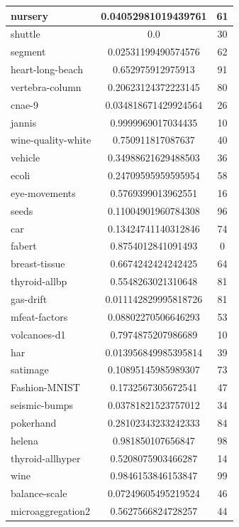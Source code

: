 \documentclass[times,specification,annotation]{itmo-student-thesis}
\begin{document}
\begin{center}
\begin{longtable}{ |m{5cm}|c|c| }
			\hline
			nursery & 0.04052981019439761 & 61 \\
			\hline
			shuttle & 0.0 & 30 \\
			\hline
			segment & 0.02531199490574576 & 62 \\
			\hline
			heart-long-beach & 0.652975912975913 & 91 \\
			\hline
			vertebra-column & 0.20623124372223145 & 80 \\
			\hline
			cnae-9 & 0.034818671429924564 & 26 \\
			\hline
			jannis & 0.9999969017034435 & 10 \\
			\hline
			wine-quality-white & 0.750911817087637 & 40 \\
			\hline
			vehicle & 0.34988621629488503 & 36 \\
			\hline
			ecoli & 0.24709595959595954 & 58 \\
			\hline
			eye-movements & 0.5769399013962551 & 16 \\
			\hline
			seeds & 0.11004901960784308 & 96 \\
			\hline
			car & 0.13424741140312846 & 74 \\
			\hline
			fabert & 0.8754012841091493 & 0 \\
			\hline
			breast-tissue & 0.6674242424242425 & 64 \\
			\hline
			thyroid-allbp & 0.5548263021310648 & 81 \\
			\hline
			gas-drift & 0.011142829995818726 & 81 \\
			\hline
			mfeat-factors & 0.08802270506646293 & 53 \\
			\hline
			volcanoes-d1 & 0.7974875207986689 & 10 \\
			\hline
			har & 0.013956849985395814 & 39 \\
			\hline
			satimage & 0.10895145985989307 & 73 \\
			\hline
			Fashion-MNIST & 0.1732567305672541 & 47 \\
			\hline
			seismic-bumps & 0.03781821523757012 & 34 \\
			\hline
			pokerhand & 0.28102343233242333 & 84 \\
			\hline
			helena & 0.981850107656847 & 98 \\
			\hline
			thyroid-allhyper & 0.5208075903466287 & 14 \\
			\hline
			wine & 0.9846153846153847 & 99 \\
			\hline
			balance-scale & 0.07249605495219524 & 46 \\
			\hline
			microaggregation2 & 0.5627566824728257 & 44 \\

\end{longtable}
\end{center}
\end{document}
